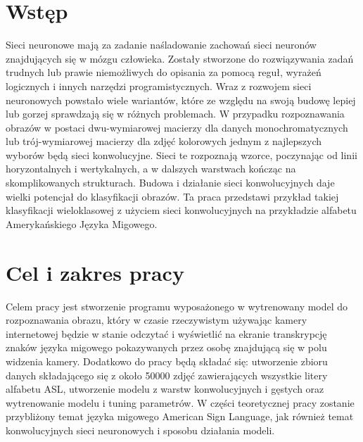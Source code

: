 \documentclass[a4paper,12pt]{book} %
\begin{document}
\sloppy
\thispagestyle{empty}

\newpage{}

\thispagestyle{empty}
\newpage{}

\tableofcontents{}

\chapter*{Wstęp}
\label{Wstep}
Sieci neuronowe mają za zadanie naśladowanie zachowań sieci neuronów znajdujących się w mózgu człowieka. Zostały stworzone do rozwiązywania zadań trudnych lub prawie niemożliwych do opisania za pomocą reguł, wyrażeń logicznych i innych narzędzi programistycznych. Wraz z rozwojem sieci neuronowych powstało wiele wariantów, które ze względu na swoją budowę lepiej lub gorzej sprawdzają się w różnych problemach. W przypadku rozpoznawania obrazów w postaci dwu-wymiarowej macierzy dla danych monochromatycznych lub trój-wymiarowej macierzy dla zdjęć kolorowych jednym z najlepszych wyborów będą sieci konwolucyjne. Sieci te rozpoznają wzorce, poczynając od linii horyzontalnych i wertykalnych, a w dalszych warstwach kończąc na skomplikowanych strukturach. Budowa i działanie sieci konwolucyjnych daje wielki potencjał do klasyfikacji obrazów. Ta praca przedstawi przykład takiej klasyfikacji wieloklasowej z użyciem sieci konwolucyjnych na przykładzie alfabetu Amerykańskiego Języka Migowego. 

\chapter*{Cel i zakres pracy}
\label{Cel i zakres pracy}
Celem pracy jest stworzenie programu wyposażonego w wytrenowany model do rozpoznawania obrazu, który w czasie rzeczywistym używając kamery internetowej będzie w stanie odczytać i wyświetlić na ekranie transkrypcję znaków języka migowego pokazywanych przez osobę znajdującą się w polu widzenia kamery. Dodatkowo do pracy będą składać się: utworzenie zbioru danych składającego się z około 50000 zdjęć zawierających wszystkie litery alfabetu ASL, utworzenie modelu z warstw konwolucyjnych i gęstych oraz wytrenowanie modelu i tuning parametrów. W części teoretycznej pracy zostanie przybliżony temat języka migowego American Sign Language, jak również temat konwolucyjnych sieci neuronowych i sposobu działania modeli.
\end{document}
